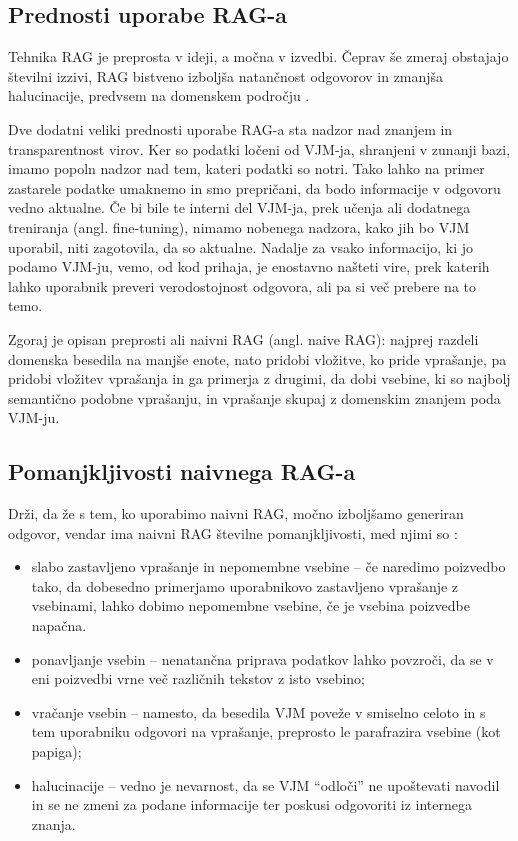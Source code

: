 \documentclass[a4paper,12pt,openright]{book}
\begin{document}
\subsection{Prednosti uporabe RAG-a}

Tehnika RAG je preprosta v ideji, a močna v izvedbi. Čeprav še zmeraj obstajajo številni izzivi, RAG bistveno izboljša natančnost odgovorov in zmanjša halucinacije, predvsem na domenskem področju \cite{benchmarking_rag}.

Dve dodatni veliki prednosti uporabe RAG-a sta nadzor nad znanjem in transparentnost virov. Ker so podatki ločeni od VJM-ja, shranjeni v zunanji bazi, imamo popoln nadzor nad tem, kateri podatki so notri. Tako lahko na primer zastarele podatke umaknemo in smo prepričani, da bodo informacije v odgovoru vedno aktualne. Če bi bile te interni del VJM-ja, prek učenja ali dodatnega treniranja (angl. fine-tuning), nimamo nobenega nadzora, kako jih bo VJM uporabil, niti zagotovila, da so aktualne. Nadalje za vsako informacijo, ki jo podamo VJM-ju, vemo, od kod prihaja, je enostavno našteti vire, prek katerih lahko uporabnik preveri verodostojnost odgovora, ali pa si več prebere na to temo.

Zgoraj je opisan preprosti ali naivni RAG \cite{rag} (angl. naive RAG): najprej razdeli domenska besedila na manjše enote, nato pridobi vložitve, ko pride vprašanje, pa pridobi vložitev vprašanja in ga primerja z drugimi, da dobi vsebine, ki so najbolj semantično podobne vprašanju, in vprašanje skupaj z domenskim znanjem poda VJM-ju.

\subsection{Pomanjkljivosti naivnega RAG-a}

Drži, da že s tem, ko uporabimo naivni RAG, močno izboljšamo generiran odgovor, vendar ima naivni RAG številne pomanjkljivosti, med njimi so \cite{rag_survey}:

\begin{itemize}
	\item slabo zastavljeno vprašanje in nepomembne vsebine – če naredimo poizvedbo tako, da dobesedno primerjamo uporabnikovo zastavljeno vprašanje z vsebinami, lahko dobimo nepomembne vsebine, če je vsebina poizvedbe napačna.
	\item ponavljanje vsebin – nenatančna priprava podatkov lahko povzroči, da se v eni poizvedbi vrne več različnih tekstov z isto vsebino;
	\item vračanje vsebin – namesto, da besedila VJM poveže v smiselno celoto in s tem uporabniku odgovori na vprašanje, preprosto le parafrazira vsebine (kot papiga);
	\item halucinacije – vedno je nevarnost, da se VJM “odloči” ne upoštevati navodil in se ne zmeni za podane informacije ter poskusi odgovoriti iz internega znanja.
\end{itemize}
\end{document}

